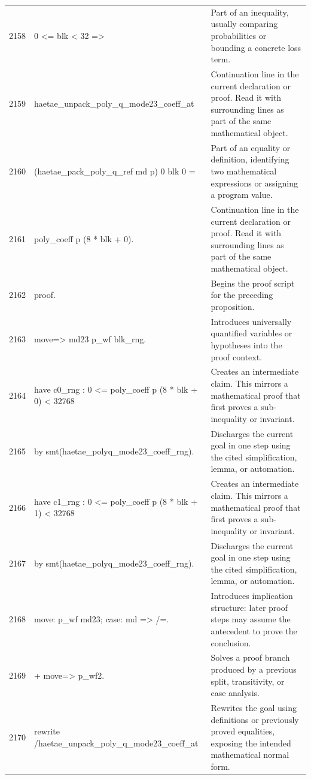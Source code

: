 \documentclass[10pt]{article}
\begin{document}
\begin{longtable}{r L{0.53\textwidth} L{0.37\textwidth}}
2158 & {\ttfamily\scriptsize   0 <= blk < 32 =>} & Part of an inequality, usually comparing probabilities or bounding a concrete loss term. \\
2159 & {\ttfamily\scriptsize   haetae\_unpack\_poly\_q\_mode23\_coeff\_at} & Continuation line in the current declaration or proof.  Read it with surrounding lines as part of the same mathematical object. \\
2160 & {\ttfamily\scriptsize     (haetae\_pack\_poly\_q\_ref md p) 0 blk 0 =} & Part of an equality or definition, identifying two mathematical expressions or assigning a program value. \\
2161 & {\ttfamily\scriptsize   poly\_coeff p (8 * blk + 0).} & Continuation line in the current declaration or proof.  Read it with surrounding lines as part of the same mathematical object. \\
2162 & {\ttfamily\scriptsize proof.} & Begins the proof script for the preceding proposition. \\
2163 & {\ttfamily\scriptsize move=> md23 p\_wf blk\_rng.} & Introduces universally quantified variables or hypotheses into the proof context. \\
2164 & {\ttfamily\scriptsize have c0\_rng : 0 <= poly\_coeff p (8 * blk + 0) < 32768} & Creates an intermediate claim.  This mirrors a mathematical proof that first proves a sub-inequality or invariant. \\
2165 & {\ttfamily\scriptsize   by smt(haetae\_polyq\_mode23\_coeff\_rng).} & Discharges the current goal in one step using the cited simplification, lemma, or automation. \\
2166 & {\ttfamily\scriptsize have c1\_rng : 0 <= poly\_coeff p (8 * blk + 1) < 32768} & Creates an intermediate claim.  This mirrors a mathematical proof that first proves a sub-inequality or invariant. \\
2167 & {\ttfamily\scriptsize   by smt(haetae\_polyq\_mode23\_coeff\_rng).} & Discharges the current goal in one step using the cited simplification, lemma, or automation. \\
2168 & {\ttfamily\scriptsize move: p\_wf md23; case: md => /=.} & Introduces implication structure: later proof steps may assume the antecedent to prove the conclusion. \\
2169 & {\ttfamily\scriptsize + move=> p\_wf2.} & Solves a proof branch produced by a previous split, transitivity, or case analysis. \\
2170 & {\ttfamily\scriptsize   rewrite /haetae\_unpack\_poly\_q\_mode23\_coeff\_at} & Rewrites the goal using definitions or previously proved equalities, exposing the intended mathematical normal form. \\

\end{longtable}
\end{document}
